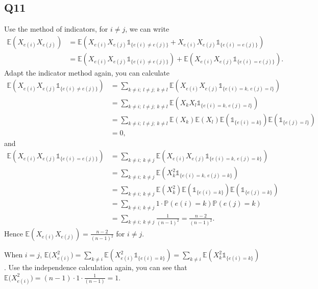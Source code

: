 \documentclass[12pt]{article}
\begin{document}
\subsection*{Q11}
Use the method of indicators, for $i\neq j$, we can write 
\begin{equation*}
\begin{aligned}
\mathbb{E}(X_{e(i)}X_{e(j)}) &= \mathbb{E}(X_{e(i)}X_{e(j)}\mathds{1}_{\{e(i)\neq e(j)\}}+X_{e(i)}X_{e(j)}\mathds{1}_{\{e(i)= e(j)\}}) \\&
=\mathbb{E}(X_{e(i)}X_{e(j)}\mathds{1}_{\{e(i)\neq e(j)\}})+\mathbb{E}(X_{e(i)}X_{e(j)}\mathds{1}_{\{e(i)= e(j)\}}).
\end{aligned}
\end{equation*}
Adapt the indicator method again, you can calculate
\begin{equation*}
\begin{aligned}
\mathbb{E}(X_{e(i)}X_{e(j)}\mathds{1}_{\{e(i)\neq e(j)\}}) &= \sum_{k\neq i;\;l\neq j;\; k\neq l}\mathbb{E}(X_{e(i)}X_{e(j)}\mathds{1}_{\{e(i)=k,\,e(j)=l\}}) \\&
=\sum_{k\neq i;\;l\neq j;\; k\neq l}\mathbb{E}(X_k X_l\mathds{1}_{\{e(i)=k,\,e(j)=l\}}) \\&
=\sum_{k\neq i;\;l\neq j;\; k\neq l}\mathbb{E}(X_k)\mathbb{E}(X_l)\mathbb{E}(\mathds{1}_{\{e(i)=k\}})\mathbb{E}(\mathds{1}_{\{e(j)=l\}}) \\&
=0,
\end{aligned}
\end{equation*}
and
\begin{equation*}
\begin{aligned}
\mathbb{E}(X_{e(i)}X_{e(j)}\mathds{1}_{\{e(i)=e(j)\}}) &= \sum_{k\neq i;\;k\neq j}\mathbb{E}(X_{e(i)}X_{e(j)}\mathds{1}_{\{e(i)=k,\,e(j)=k\}}) \\&
=\sum_{k\neq i;\;k\neq j}\mathbb{E}(X_k^2\mathds{1}_{\{e(i)=k,\,e(j)=k\}}) \\&
=\sum_{k\neq i;\;k\neq j}\mathbb{E}(X_k^2)\mathbb{E}(\mathds{1}_{\{e(i)=k\}})\mathbb{E}(\mathds{1}_{\{e(j)=k\}}) \\&
=\sum_{k\neq i;\;k\neq j}1\cdot\mathbb{P}(e(i)=k)\mathbb{P}(e(j)=k) \\&
=\sum_{k\neq i;\;k\neq j}\frac{1}{(n-1)^2} = \frac{n-2}{(n-1)^2}.
\end{aligned}
\end{equation*}
Hence $\mathbb{E}(X_{e(i)}X_{e(j)})=\frac{n-2}{(n-1)^2}$ for $i\neq j$.

When $i=j$, $\mathbb{E}\big(X_{e(i)}^2\big)=\sum_{k\neq i}\mathbb{E}(X_{e(i)}^2\mathds{1}_{\{e(i)=k\}})=\sum_{k\neq i}\mathbb{E}(X_k^2\mathds{1}_{\{e(i)=k\}})$. Use the independence calculation again, you can see that $\mathbb{E}\big(X_{e(i)}^2\big)=(n-1)\cdot1\cdot\frac{1}{(n-1)}=1$.
\end{document}
